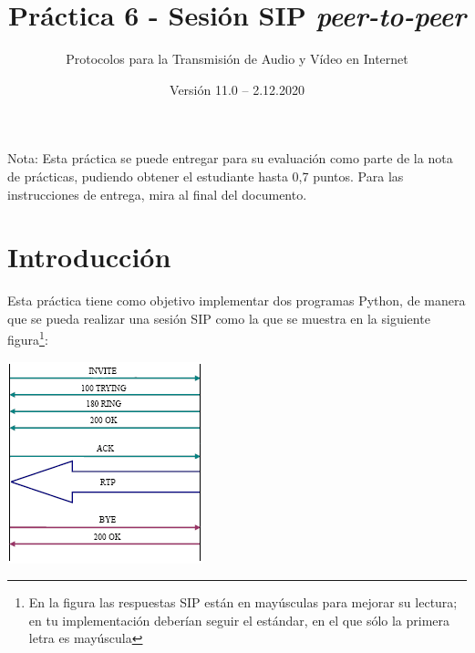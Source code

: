 \documentclass[a4paper,11pt]{article}
\begin{document}
\title{Práctica 6 - Sesión SIP \emph{peer-to-peer}}
\author{Protocolos para la Transmisión de Audio y Vídeo en Internet}
\date{Versión 11.0 -- 2.12.2020}



\maketitle
\thispagestyle{empty}



Nota: Esta práctica se puede entregar para su evaluación como parte de la nota de prácticas, pudiendo obtener el estudiante hasta 0,7 puntos. Para las instrucciones de entrega, mira al final del documento.

\section*{Introducción}

Esta práctica tiene como objetivo implementar dos programas Python,
de manera que se pueda realizar una sesión SIP como la que se
muestra en la siguiente figura\footnote{En la figura las respuestas SIP están en 
mayúsculas para mejorar su lectura; en tu implementación deberían seguir el 
estándar, en el que sólo la primera letra es mayúscula}:

\begin{center}
\includegraphics{figs/sip-invite.png}
\end{center}
\end{document}
